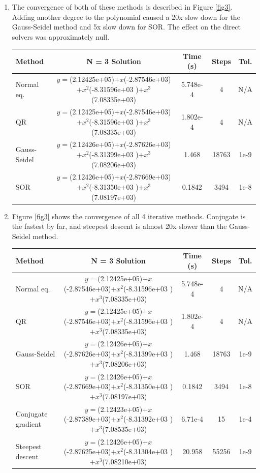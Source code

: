 \documentclass[10pt, preprint]{aastex}
\begin{document}
\begin{enumerate}
\item The convergence of both of these methods is described in Figure \ref{fig3}. Adding another degree to the polynomial caused a 20x slow down for the Gauss-Seidel method and 5x slow down for SOR. The effect on the direct solvers was approximately null.
\begin{table}[!ht]
\centering
\begin{tabular}{l c c c c}
  \bf{Method} & \bf{N = 3 Solution} & \bf{Time (s)} & \bf{Steps} & \bf{Tol.}\\ \hline
  Normal eq. & $y=$(2.12425e+05)$+x$(-2.87546e+03)$+x^2$(-8.31596e+03 )$+x^3$(7.08335e+03) 
  & 5.748e-4 & 4 & N/A \\
  QR         & $y=$(2.12425e+05)$+x$(-2.87546e+03)$+x^2$(-8.31596e+03 )$+x^3$(7.08335e+03) 
  & 1.802e-4 & 4 & N/A \\
  Gauss-Seidel & $y=$(2.12426e+05)$+x$(-2.87626e+03)$+x^2$(-8.31399e+03 )$+x^3$(7.08206e+03) 
  & 1.468 & 18763 & 1e-9 \\
  SOR &  $y=$(2.12426e+05)$+x$(-2.87669e+03)$+x^2$(-8.31350e+03 )$+x^3$(7.08197e+03) 
  & 0.1842 & 3494 & 1e-8 \\
\end{tabular}
\end{table}


\item Figure \ref{fig3} shows the convergence of all 4 iterative methods. Conjugate is the fastest by far, and steepest descent is almost 20x slower than the Gauss-Seidel method.

\begin{table}[!ht]
\centering
\begin{tabular}{l c c c c}
  \bf{Method} & \bf{N = 3 Solution} & \bf{Time (s)} & \bf{Steps} & \bf{Tol.}\\ \hline
  Normal eq. & $y=$(2.12425e+05)$+x$(-2.87546e+03)$+x^2$(-8.31596e+03 )$+x^3$(7.08335e+03) 
  & 5.748e-4 & 4 & N/A \\
  QR         & $y=$(2.12425e+05)$+x$(-2.87546e+03)$+x^2$(-8.31596e+03 )$+x^3$(7.08335e+03) 
  & 1.802e-4 & 4 & N/A \\
  Gauss-Seidel & $y=$(2.12426e+05)$+x$(-2.87626e+03)$+x^2$(-8.31399e+03 )$+x^3$(7.08206e+03) 
  & 1.468 & 18763 & 1e-9 \\
  SOR &  $y=$(2.12426e+05)$+x$(-2.87669e+03)$+x^2$(-8.31350e+03 )$+x^3$(7.08197e+03) 
  & 0.1842 & 3494 & 1e-8 \\
  Conjugate gradient &  $y=$(2.12423e+05)$+x$(-2.87389e+03)$+x^2$(-8.31392e+03 )$+x^3$(7.08535e+03) 
  & 6.71e-4 & 15 & 1e-4 \\
  Steepest descent &  $y=$(2.12426e+05)$+x$(-2.87625e+03)$+x^2$(-8.31304e+03 )$+x^3$(7.08210e+03) 
  & 20.958 & 55256 & 1e-9 \\
\end{tabular}
\end{table}


\end{enumerate}
\end{document}
